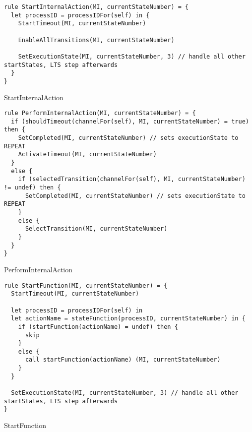 \begin{listing}[H]
\begin{verbatim}
rule StartInternalAction(MI, currentStateNumber) = {
  let processID = processIDFor(self) in {
    StartTimeout(MI, currentStateNumber)

    EnableAllTransitions(MI, currentStateNumber)

    SetExecutionState(MI, currentStateNumber, 3) // handle all other startStates, LTS step afterwards
  }
}
\end{verbatim}
\caption{StartInternalAction}
\label{lst:asm:StartInternalAction}
\end{listing}




\begin{listing}[H]
\begin{verbatim}
rule PerformInternalAction(MI, currentStateNumber) = {
  if (shouldTimeout(channelFor(self), MI, currentStateNumber) = true) then {
    SetCompleted(MI, currentStateNumber) // sets executionState to REPEAT
    ActivateTimeout(MI, currentStateNumber)
  }
  else {
    if (selectedTransition(channelFor(self), MI, currentStateNumber) != undef) then {
      SetCompleted(MI, currentStateNumber) // sets executionState to REPEAT
    }
    else {
      SelectTransition(MI, currentStateNumber)
    }
  }
}
\end{verbatim}
\caption{PerformInternalAction}
\label{lst:asm:PerformInternalAction}
\end{listing}






\begin{listing}[H]
\begin{verbatim}
rule StartFunction(MI, currentStateNumber) = {
  StartTimeout(MI, currentStateNumber)

  let processID = processIDFor(self) in
  let actionName = stateFunction(processID, currentStateNumber) in {
    if (startFunction(actionName) = undef) then {
      skip
    }
    else {
      call startFunction(actionName) (MI, currentStateNumber)
    }
  }

  SetExecutionState(MI, currentStateNumber, 3) // handle all other startStates, LTS step afterwards
}
\end{verbatim}
\caption{StartFunction}
\label{lst:asm:StartFunction}
\end{listing}




